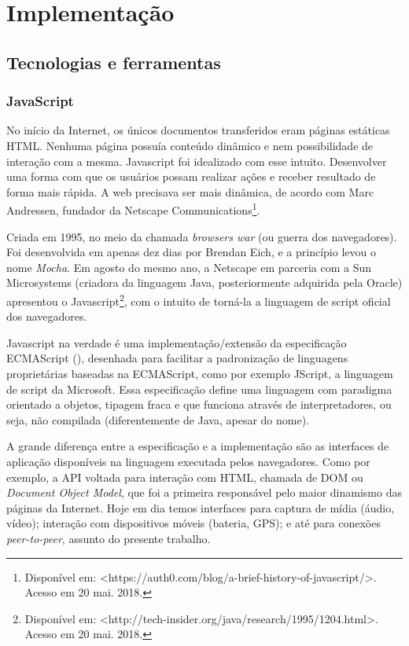 \chapter[Implementação]{Implementação}\label{chap:implementacao}

\section{Tecnologias e ferramentas}

\subsection{JavaScript}

No início da Internet, os únicos documentos transferidos eram páginas estáticas HTML. Nenhuma página possuía conteúdo dinâmico e nem possibilidade de interação com a mesma. Javascript foi idealizado com esse intuito. Desenvolver uma forma com que os usuários possam realizar ações e receber resultado de forma mais rápida. A web precisava ser mais dinâmica, de acordo com Marc Andressen, fundador da Netscape Communications\footnote{Disponível em: <https://auth0.com/blog/a-brief-history-of-javascript/>. Acesso em 20 mai. 2018.}.

Criada em 1995, no meio da chamada \textit{browsers war} (ou guerra dos navegadores). Foi desenvolvida em apenas dez dias por Brendan Eich, e a princípio levou o nome \textit{Mocha}. Em agosto do mesmo ano, a Netscape em parceria com a Sun Microsystems (criadora da linguagem Java, posteriormente adquirida pela Oracle) apresentou o  Javascript\footnote{Disponível em: <http://tech-insider.org/java/research/1995/1204.html>. Acesso em 20 mai. 2018.}, com o intuito de torná-la a linguagem de script oficial dos navegadores.

Javascript na verdade é uma implementação/extensão da especificação ECMAScript (\cite{ecmascript}), desenhada para facilitar a padronização de  linguagens proprietárias baseadas na ECMAScript, como por exemplo JScript, a linguagem de script da Microsoft. Essa especificação define uma linguagem com paradigma orientado a objetos, tipagem fraca e que funciona através de interpretadores, ou seja, não compilada (diferentemente de Java, apesar do nome).

A grande diferença entre a especificação e a implementação são as interfaces de aplicação disponíveis na linguagem executada pelos navegadores. Como por exemplo, a API voltada para interação com HTML, chamada de DOM ou \textit{Document Object Model}, que foi a primeira responsável pelo maior dinamismo das páginas da Internet. Hoje em dia temos interfaces para captura de mídia (áudio, vídeo); interação com dispositivos móveis (bateria, GPS); e até para conexões \textit{peer-to-peer}, assunto do presente trabalho.

